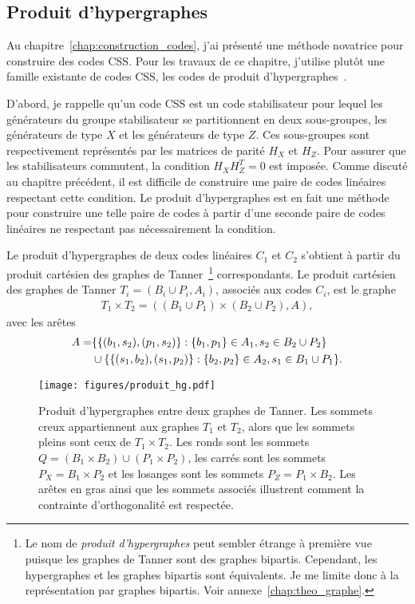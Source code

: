 \subsection{Produit d'hypergraphes}

Au chapitre~\ref{chap:construction_codes},
j'ai présenté une méthode novatrice pour construire des codes CSS.
Pour les travaux de ce chapitre,
j'utilise plutôt une famille existante de codes CSS,
les codes de produit d'hypergraphes~\cite{tillich_quantum_2014}.

D'abord,
je rappelle qu'un code CSS est un code stabilisateur pour lequel les générateurs du groupe
stabilisateur se partitionnent en deux sous-groupes, 
les générateurs de type $X$ et les générateurs de type $Z$.
Ces sous-groupes sont respectivement représentés par les matrices de parité $H_X$ et $H_Z$.
Pour assurer que les stabilisateurs commutent,
la condition $H_X H_Z^T = 0$ est imposée.
Comme discuté au chapitre précédent,
il est difficile de construire une paire de codes linéaires
respectant cette condition.
Le produit d'hypergraphes est en fait une méthode pour construire
une telle paire de codes à partir d'une seconde paire de codes linéaires
ne respectant pas nécessairement la condition.

Le produit d'hypergraphes de deux codes linéaires $C_1$ et $C_2$
s'obtient à partir du produit cartésien des graphes de 
Tanner~\footnote{Le nom de \textit{produit d'hypergraphes} peut sembler étrange à première
vue puisque les graphes de Tanner sont des graphes bipartis. Cependant, les hypergraphes et les graphes
bipartis sont équivalents. Je me limite donc à la représentation par graphes bipartis.
Voir annexe~\ref{chap:theo_graphe}.} correspondants.
Le produit cartésien des graphes de Tanner $T_i = (B_i \cup P_i, A_i)$,
associés aux codes $C_i$, 
est le graphe 
\begin{align}
	T_1 \times T_2 = ((B_1 \cup P_1) \times (B_2 \cup P_2), A),
\end{align}
avec les arêtes 
\begin{align}
	A = 
	&\qty{
		\qty{(b_1, s_2), (p_1, s_2)} :
		\qty{b_1, p_1} \in A_1, s_2 \in B_2 \cup P_2
	} 
	\notag\\
	&\cup
	\qty{
		\qty{(s_1, b_2), (s_1, p_2)} :
		\qty{b_2, p_2} \in A_2, s_1 \in B_1 \cup P_1
	}.
\end{align}

\begin{figure}
	\centering
	\texttt{[image: figures/produit\_hg.pdf]}
	\caption[Produit d'hypergraphes]{
		Produit d'hypergraphes entre deux graphes de Tanner.
		Les sommets creux appartiennent aux graphes $T_1$ et $T_2$,
		alors que les sommets pleins sont ceux de $T_1 \times T_2$.
		Les ronds sont les sommets $Q = (B_1 \times B_2) \cup (P_1 \times P_2)$,
		les carrés sont les sommets $P_X = B_1 \times P_2$
		et les losanges sont les sommets $P_Z = P_1 \times B_2$.
		Les arêtes en gras ainsi que les sommets associés illustrent comment
		la contrainte d'orthogonalité est respectée.
	}
	\label{fig:produit_hg}
\end{figure}

